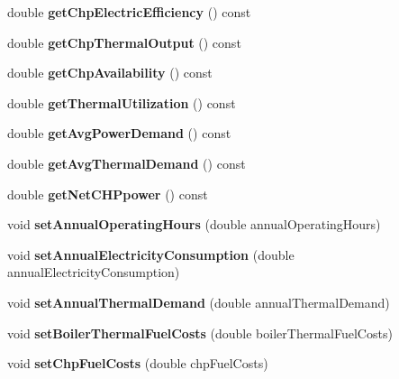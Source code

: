 \begin{DoxyCompactItemize}
double {\bfseries get\+Chp\+Electric\+Efficiency} () const
\item 
\mbox{\label{class_c_h_p_a13e271f59d6315088416123c6e794e09}} 
double {\bfseries get\+Chp\+Thermal\+Output} () const
\item 
\mbox{\label{class_c_h_p_abd1ea13cd48f5af48799891a52634340}} 
double {\bfseries get\+Chp\+Availability} () const
\item 
\mbox{\label{class_c_h_p_aa27fd9e66e208e6b3f28fdfe182d6c32}} 
double {\bfseries get\+Thermal\+Utilization} () const
\item 
\mbox{\label{class_c_h_p_a79f9a97a010669c5ffed9339c54a36c6}} 
double {\bfseries get\+Avg\+Power\+Demand} () const
\item 
\mbox{\label{class_c_h_p_a5f8975488324e4aa3517c9e01334f4bf}} 
double {\bfseries get\+Avg\+Thermal\+Demand} () const
\item 
\mbox{\label{class_c_h_p_a317f3df613b61f401bc5c4b69fddd0cf}} 
double {\bfseries get\+Net\+C\+H\+Ppower} () const
\item 
\mbox{\label{class_c_h_p_a1b9d3ba01f7e243bcde31bd5fdff9e0a}} 
void {\bfseries set\+Annual\+Operating\+Hours} (double annual\+Operating\+Hours)
\item 
\mbox{\label{class_c_h_p_a306aa3de555bb7dbd79e7aeb1658713e}} 
void {\bfseries set\+Annual\+Electricity\+Consumption} (double annual\+Electricity\+Consumption)
\item 
\mbox{\label{class_c_h_p_aa7abaae6cf4d62059eff750498d70076}} 
void {\bfseries set\+Annual\+Thermal\+Demand} (double annual\+Thermal\+Demand)
\item 
\mbox{\label{class_c_h_p_a13c93cd6b6bba4d52b2f8fd10638724e}} 
void {\bfseries set\+Boiler\+Thermal\+Fuel\+Costs} (double boiler\+Thermal\+Fuel\+Costs)
\item 
\mbox{\label{class_c_h_p_a419c9eaf0ad6009bb3dd753e4b1dd63b}} 
void {\bfseries set\+Chp\+Fuel\+Costs} (double chp\+Fuel\+Costs)

\end{DoxyCompactItemize}
